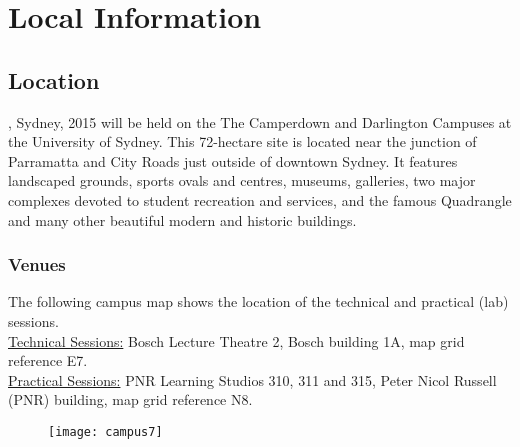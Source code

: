 {}
\section*{Local Information}
%
%
{}
\subsection*{Location}
\mlss, Sydney, 2015 will be held on the The Camperdown and Darlington Campuses at the University of Sydney. 
This 72-hectare site is located near the junction of Parramatta and City Roads just outside of downtown Sydney. It features landscaped grounds, sports ovals and centres, museums, galleries, two major complexes devoted to student recreation and services, and the famous Quadrangle and many other beautiful modern and historic buildings.  
%
\subsubsection*{Venues}
The following campus map shows the location of the  technical  and  practical (lab) sessions. \\ 
%
\underline{Technical Sessions:}
%
Bosch Lecture Theatre 2, Bosch building 1A,  map grid reference E7. \\
%
\underline{Practical Sessions:}
PNR Learning Studios 310, 311 and 315, Peter Nicol Russell (PNR) building, map grid reference N8.
%
\begin{figure}[h!]
\texttt{[image: campus7]}
\end{figure}

\clearpage


{}
